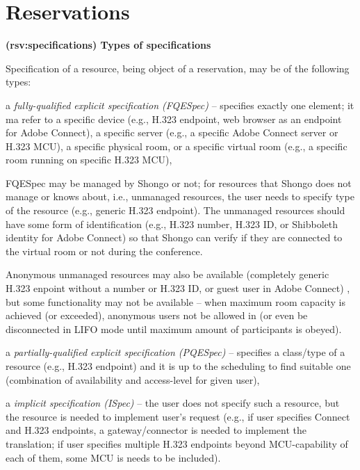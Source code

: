 \documentclass[a4paper]{report}
\makeatletter
\newcounter{UCcounter}
\newenvironment{UseCases}%
	{\begin{list}{\textbf{UC-\arabic{UCcounter}}}{\@nmbrlisttrue\def\@listctr{UCcounter}}}%
	{\end{list}}
\newcommand{\UClabel}[1]{\label{UC:#1}}
\newcommand{\UseCase}[2]{\item\UClabel{#2} \textbf{(#2) #1}\\ \nopagebreak}
\makeatother
\begin{document}
\section{Reservations}

\begin{UseCases}

\UseCase{Types of specifications}{rsv:specifications}

Specification of a resource, being object of a reservation, may be of the
following types:

\begin{compactitem}

\item a \emph{fully-qualified explicit specification (FQESpec)} -- specifies
exactly one element; it ma refer to a specific device (e.g., H.323 endpoint,
web browser as an endpoint for Adobe Connect), a specific server (e.g., a
specific Adobe Connect server or H.323 MCU), a specific physical room, or a
specific virtual room (e.g., a specific room running on specific H.323 MCU),

FQESpec may be managed by Shongo or not; for resources that Shongo does not
manage or knows about, i.e., unmanaged resources, the user needs to specify
type of the resource (e.g., generic H.323 endpoint). The unmanaged resources
should have some form of identification (e.g., H.323 number, H.323 ID, or
Shibboleth identity for Adobe Connect) so that Shongo can verify if they are
connected to the virtual room or not during the conference. 

Anonymous unmanaged resources may also be available (completely generic H.323
enpoint without a number or H.323 ID, or guest user in Adobe Connect) , but
some functionality may not be available -- when maximum room capacity is
achieved (or exceeded), anonymous users not be allowed in (or even be
disconnected in LIFO mode until maximum amount of participants is obeyed).


\item a \emph{partially-qualified explicit specification (PQESpec)} --
specifies a class/type of a resource (e.g., H.323 endpoint) and it is up to the
scheduling to find suitable one (combination of availability and access-level
for given user),

\item a \emph{implicit specification (ISpec)} -- the user does not specify such
a resource, but the resource is needed to implement user's request (e.g., if
user specifies Connect and H.323 endpoints, a gateway/connector is needed to
implement the translation; if user specifies multiple H.323 endpoints beyond
MCU-capability of each of them, some MCU is needs to be included).  


\end{compactitem}
\end{UseCases}
\end{document}

